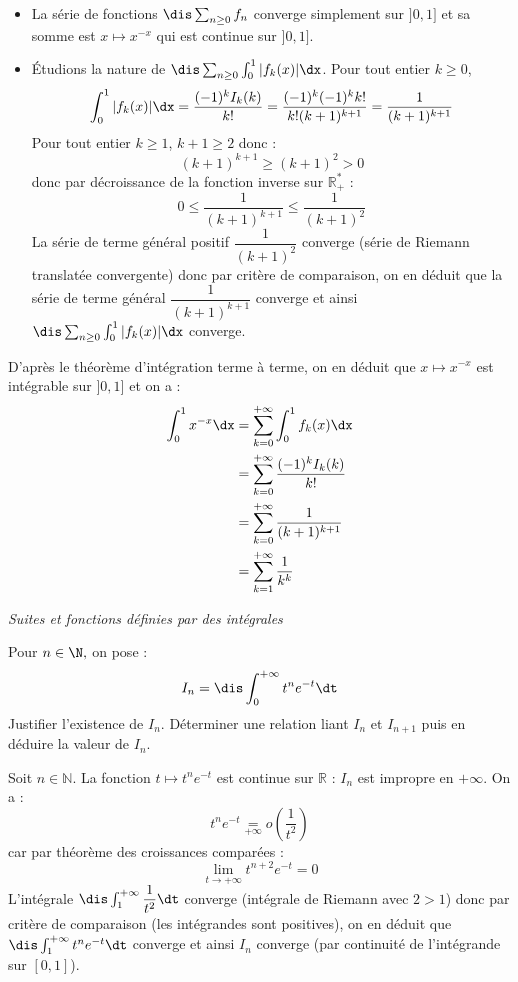 \documentclass[a4paper,10pt]{report}
\begin{document}
\begin{enumerate}
\begin{itemize}
\item La série de fonctions $\dis \sum_{n \geq 0} f_n$ converge simplement sur $]0,1]$ et sa somme est $x \mapsto x^{-x}$ qui est continue sur $]0,1]$.
\item Étudions la nature de $\dis \sum_{n \geq 0} \int_0^1 \vert f_k(x) \vert\dx$. Pour tout entier $k \geq 0$,
$$ \int_0^1 \vert f_k(x) \vert\dx = \dfrac{(-1)^k I_k(k)}{k!} = \dfrac{(-1)^k(-1)^k k!}{k! (k+1)^{k+1}} = \dfrac{1}{(k+1)^{k+1}}$$
Pour tout entier $k \geq 1$, $k+1 \geq 2$ donc : 
$$ (k+1)^{k+1} \geq (k+1)^2 >0$$
donc par décroissance de la fonction inverse sur $\mathbb{R}_+^{*}$ :
$$ 0 \leq \dfrac{1}{(k+1)^{k+1}} \leq \dfrac{1}{(k+1)^2}$$
La série de terme général positif $\dfrac{1}{(k+1)^2}$ converge (série de Riemann translatée convergente) donc par critère de comparaison, on en déduit que la série de terme général $\dfrac{1}{(k+1)^{k+1}}$ converge et ainsi $\dis \sum_{n \geq 0} \int_0^1 \vert f_k(x) \vert\dx$ converge.
\end{itemize}
D'après le théorème d'intégration terme à terme, on en déduit que $x \mapsto x^{-x}$ est intégrable sur $]0,1]$ et on a :
\begin{align*}
\int_0^1 x^{-x} \dx & = \sum_{k=0}^{+ \infty} \int_0^1 f_k(x) \dx \\
& = \sum_{k=0}^{+ \infty} \dfrac{(-1)^k I_k(k)}{k!} \\
& = \sum_{k=0}^{+ \infty} \dfrac{1}{(k+1)^{k+1}} \\
& = \sum_{k=1}^{+ \infty} \dfrac{1}{k^k}
\end{align*}
\end{enumerate}


\medskip

\begin{center}
\textit{{ {\large Suites et fonctions définies par des intégrales}}}
\end{center}

\medskip

\begin{Exercice}{} Pour $n\in\N,$ on pose :
$$I_n=\dis\int_0^{+\infty} t^ne^{-t} \dt$$
Justifier l'existence de $I_n$. D\'eterminer une relation liant $I_n$ et $I_{n+1}$ puis en d\'eduire la valeur de $I_n.$
\end{Exercice} 

\corr Soit $n \in \mathbb{N}$. La fonction $t \mapsto  t^ne^{-t}$ est continue sur $\mathbb{R}$ : $I_n$ est impropre en $+ \infty$. On a :
$$ t^n e^{-t} \underset{ +\infty}{=} o \left( \dfrac{1}{t^2} \right)$$
car par théorème des croissances comparées :
$$ \lim_{t \rightarrow + \infty} t^{n+2} e^{-t}=0$$
L'intégrale $\dis \int_1^{+ \infty} \dfrac{1}{t^2} \dt$ converge (intégrale de Riemann avec $2>1$) donc par critère de comparaison (les intégrandes sont positives), on en déduit que $\dis \int_1^{+ \infty} t^n e^{-t} \dt$ converge et ainsi $I_n$ converge (par continuité de l'intégrande sur $[0,1]$).
\end{document}
